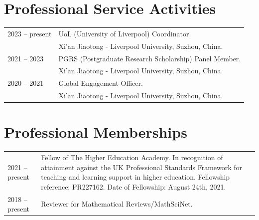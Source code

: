 \documentclass[a4paper,12pt]{article}
\begin{document}
\section*{\Large{Professional Service Activities}}
\begin{tabular}{@{}p{1.4in}p{4in}} 
2023 -- present & UoL (University of Liverpool) Coordinator. \\
                           & Xi'an Jiaotong - Liverpool University, Suzhou, China.  \\
2021 -- 2023 & PGRS (Postgraduate Research Scholarship) Panel Member. \\
                           & Xi'an Jiaotong - Liverpool University, Suzhou, China.  \\
2020 -- 2021 & Global Engagement Officer. \\
             & Xi'an Jiaotong - Liverpool University, Suzhou, China.                  
\end{tabular}

\section*{\Large{Professional Memberships}}
\begin{tabular}{@{}p{1.4in}p{4in}} 
2021 -- present & Fellow of The Higher Education Academy. 
In recognition of attainment against the UK
Professional Standards Framework for teaching and learning support in higher education.
Fellowship reference: PR227162. Date of Fellowship: August 24th, 2021. \\
2018 -- present &  Reviewer for Mathematical Reviews/MathSciNet.            
\end{tabular}
\end{document}
